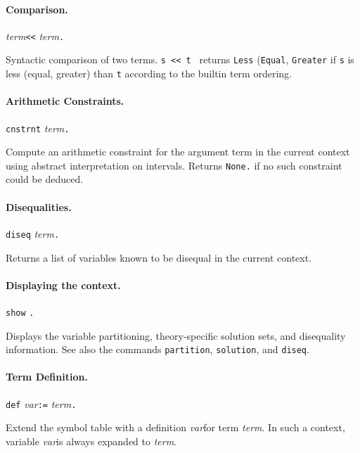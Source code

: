 \documentclass[12pt]{article}
\newcommand{\term}{\textit{term}}
\newcommand{\var}{\textit{var}}
\begin{document}
\paragraph{Comparison.}
  \begin{center}
  \term \texttt{<<} \term \texttt{.}
  \end{center}
Syntactic comparison of two terms. \texttt{s << t } returns 
\texttt{Less} (\texttt{Equal}, \texttt{Greater}
if \texttt{s} is less (equal, greater) than \texttt{t} according
to the builtin term ordering.

\paragraph{Arithmetic Constraints.}
  \begin{center}
  \texttt{cnstrnt} \term \texttt{.}
  \end{center}
Compute an arithmetic constraint for the argument term in
the current context using abstract interpretation on intervals.
Returns \texttt{None.} if no such constraint could be deduced.

\paragraph{Disequalities.}
  \begin{center}
  \texttt{diseq} \term \texttt{.}
  \end{center}
Returns a list of variables known to be disequal in the
current context.

\paragraph{Displaying the context.}
  \begin{center}
  \texttt{show} \texttt{.}
  \end{center}
Displays the variable partitioning, theory-specific
solution sets, and disequality information. See also the 
commands \texttt{partition}, \texttt{solution}, and \texttt{diseq}\@.

\paragraph{Term Definition.}
  \begin{center}
  \texttt{def} \var \texttt{:=} \term \texttt{.}
  \end{center}
Extend the symbol table with a definition \var for term \term\@.
In such a context, variable \var is always expanded to \term.
\end{document}
